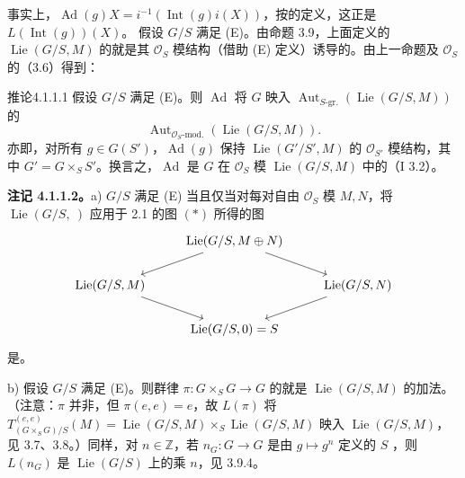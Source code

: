 事实上，$\operatorname{Ad}(g)X=i^{-1}(\operatorname{Int}(g)i(X))$，按的定义，这正是 $L(\operatorname{Int}(g))(X)$。
假设 $G/S$ 满足 (E)。由命题 3.9，上面定义的 $\operatorname{Lie}(G/S,M)$ 的就是其 $\mathcal O_S$ 模结构（借助 (E) 定义）诱导的。由上一命题及 $\mathcal O_S$ 的（3.6）得到：
\begin{SGAresult}{推论}{4.1.1.1}
假设 $G/S$ 满足 (E)。则 $\operatorname{Ad}$ 将 $G$ 映入 $\operatorname{Aut}_{S\text{-gr.}}(\operatorname{Lie}(G/S,M))$ 的
\[\operatorname{Aut}_{\mathcal O_S\text{-mod.}}(\operatorname{Lie}(G/S,M)).\]
亦即，对所有 $g\in G(S')$，$\operatorname{Ad}(g)$ 保持 $\operatorname{Lie}(G'/S',M)$ 的 $\mathcal O_{S'}$ 模结构，其中 $G'=G\times_SS'$。换言之，$\operatorname{Ad}$ 是 $G$ 在 $\mathcal O_S$ 模 $\operatorname{Lie}(G/S,M)$ 中的（I 3.2）。
\end{SGAresult}
\textbf{注记 4.1.1.2。}a) $G/S$ 满足 (E) 当且仅当对每对自由 $\mathcal O_S$ 模 $M,N$，将 $\operatorname{Lie}(G/S,\ )$ 应用于 2.1 的图 $(*)$ 所得的图
\[\begin{tikzcd}
&\operatorname{Lie}(G/S,M\oplus N)\arrow[dl]\arrow[dr]&\\
\operatorname{Lie}(G/S,M)\arrow[dr]&&\operatorname{Lie}(G/S,N)\arrow[dl]\\
&\operatorname{Lie}(G/S,0)=S&
\end{tikzcd}\]
是。

b) 假设 $G/S$ 满足 (E)。则群律 $\pi:G\times_SG\to G$ 的就是 $\operatorname{Lie}(G/S,M)$ 的加法。（注意：$\pi$ 并非，但 $\pi(e,e)=e$，故 $L(\pi)$ 将
$T^{(e,e)}_{(G\times_SG)/S}(M)=\operatorname{Lie}(G/S,M)\times_S\operatorname{Lie}(G/S,M)$ 映入 $\operatorname{Lie}(G/S,M)$，见 3.7、3.8。）同样，对 $n\in\mathbb Z$，若 $n_G:G\to G$ 是由 $g\mapsto g^n$ 定义的 $S$ ，则 $L(n_G)$ 是 $\operatorname{Lie}(G/S)$ 上的乘 $n$，见 3.9.4。

